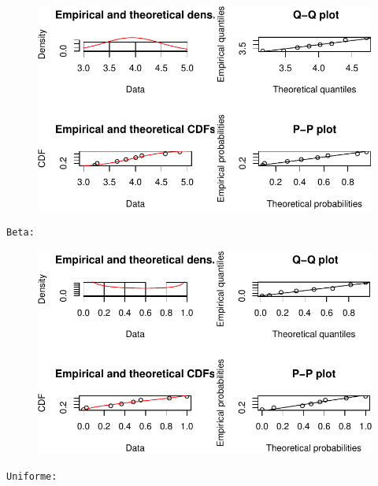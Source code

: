 \documentclass[
  letterpaper,
  DIV=11,
  numbers=noendperiod]{scrartcl}
\begin{document}
\begin{figure}[H]

{\centering \includegraphics{quiz5_files/figure-pdf/unnamed-chunk-39-5.pdf}

}

\end{figure}

\begin{verbatim}
Beta: 
\end{verbatim}

\begin{figure}[H]

{\centering \includegraphics{quiz5_files/figure-pdf/unnamed-chunk-39-6.pdf}

}

\end{figure}

\begin{verbatim}
Uniforme: 
\end{verbatim}
\end{document}
